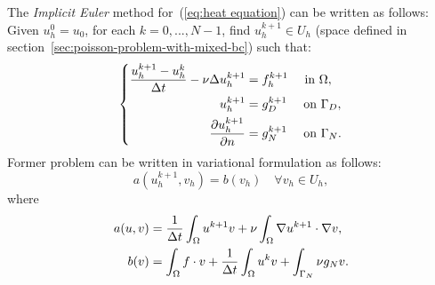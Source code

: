 \documentclass[12pt]{article}
\begin{document}
The \textit{Implicit Euler} method for~(\ref{eq:heat equation}) can be
written as follows:
Given $u^0_h=u_0$, for each $k=0,...,N-1$, find $u^{k+1}_h\in U_h$ (space
defined in section~\ref{sec:poisson-problem-with-mixed-bc}) such that:
\begin{equation}
  \label{eq:euler-implicit-heat-equation}
  \left\{
    \begin{aligned}
      \frac{u^{k+1}_h-u^k_h}{\Delta t} -\nu\Delta u^{k+1}_h &= f^{k+1}_h \quad \text{ in } \Omega, \\
      u^{k+1}_h &= g_D^{k+1} \quad \text{ on } \Gamma_D, \\
      \frac{\partial u^{k+1}_h}{\partial n} &= g_N^{k+1} \quad \text{ on } \Gamma_N.
    \end{aligned}
    \right.
\end{equation}
Former problem can be written in variational formulation as follows:
\begin{equation*}
  a(u^{k+1}_h,v_h) = b(v_h) \quad \forall v_h\in U_h,
\end{equation*}
where
\begin{equation*}
    \begin{aligned}
      a(u,v)&=\frac{1}{\Delta t} \int_\Omega u^{k+1} v + \nu\int_\Omega \nabla
      u^{k+1} \cdot \nabla v,
      \\
      b(v)  &= \int_\Omega f \cdot v
      +\frac{1}{\Delta t} \int_\Omega  u^{k} v
      +\int_{\Gamma_N} \nu g_N v.
    \end{aligned}
\end{equation*}
\end{document}

